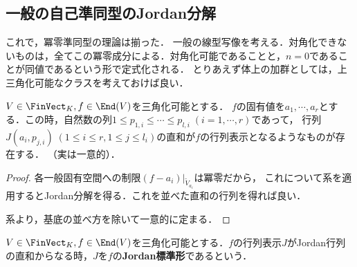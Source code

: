 \documentclass[uplatex, dvipdfmx]{jsreport}
\begin{document}
\subsection{一般の自己準同型のJordan分解}

\begin{tcolorbox}[colframe=ForestGreen, colback=ForestGreen!10!white, breakable]
    これで，冪零準同型の理論は揃った．
    一般の線型写像を考える．対角化できないものは，全てこの冪零成分による．対角化可能であることと，$n=0$であることが同値であるという形で定式化される．
    とりあえず体上の加群としては，上三角化可能なクラスを考えておけば良い．
\end{tcolorbox}

\begin{corollary}[一般の線型写像のJordan標準形]
    $V\in\FinVect_K,f\in\End(V)$を三角化可能とする．
    $f$の固有値を$a_1,\cdots,a_r$とする．この時，自然数の列$1\le p_{1,i}\le\cdots\le p_{l,i}\;(i=1,\cdots,r)$であって，
    行列$J(a_i,p_{j,i})\;(1\le i\le r,1\le j\le l_i)$の直和が$f$の行列表示となるようなものが存在する．
    （実は一意的）．
\end{corollary}
\begin{proof}
    各一般固有空間への制限$(f-a_i)|_{\tilde{V}_{a_i}}$は冪零だから，
    これについて系を適用するとJordan分解を得る．これを並べた直和の行列を得れば良い．

    系より，基底の並べ方を除いて一意的に定まる．
\end{proof}

\begin{definition}
    $V\in\FinVect_K,f\in\End(V)$を三角化可能とする．$f$の行列表示$J$がJordan行列の直和からなる時，$J$を$f$の\textbf{Jordan標準形}であるという．
\end{definition}
\end{document}
